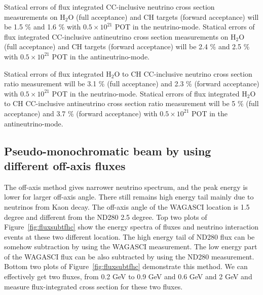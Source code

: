 Statical errors of flux integrated CC-inclusive neutrino cross section measurements on H$_{2}$O (full acceptance) and CH targets (forward acceptance)
will be 1.5 \% and 1.6 \% with $0.5\times 10^{21}$ POT in the neutrino-mode.
Statical errors of flux integrated CC-inclusive antineutrino cross section measurements on H$_{2}$O (full acceptance) and CH targets (forward acceptance)
will be 2.4 \% and 2.5 \% with $0.5\times 10^{21}$ POT in the antineutrino-mode.


Statical errors of flux integrated H$_{2}$O to CH CC-inclusive neutrino cross section ratio measurement 
will be 3.1 \% (full acceptance) and 2.3 \% (forward acceptance) with $0.5\times 10^{21}$ POT in the neutrino-mode.
Statical errors of flux integrated H$_{2}$O to CH CC-inclusive antineutrino cross section ratio measurement will be 5 \% (full acceptance) and 3.7 \% (forward acceptance) with $0.5\times 10^{21}$ POT in the antineutrino-mode.


\subsection{Pseudo-monochromatic beam by using different off-axis fluxes}
The off-axis method gives narrower neutrino spectrum, and the peak energy is lower for larger off-axis angle.
There still remains high energy tail mainly due to neutrinos from Kaon decay.
The off-axis angle of the WAGASCI location is 1.5 degree and different from the ND280 2.5 degree.
Top two plots of Figure~\ref{fig:fluxsubtfhc} show the energy spectra of fluxes and neutrino interaction events
at these two different location.
The high energy tail of ND280 flux can be somehow subtraction by using the WAGASCI measurement.
The low energy part of the WAGASCI flux can be also subtracted by using the ND280 measurement.
Bottom two plots of Figure~\ref{fig:fluxsubtfhc} demonstrate this method.
We can effectively get two fluxes, from 0.2 GeV to 0.9 GeV and 0.6 GeV and 2 GeV
and measure flux-integrated cross section for these two fluxes.

